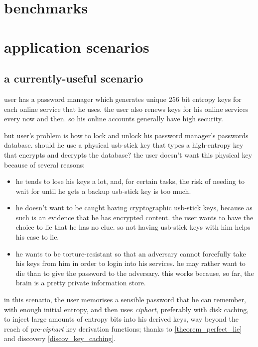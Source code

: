 \documentclass[twocolumn]{article}
\begin{document}
\section{benchmarks}

\section{application scenarios}
\subsection{a currently-useful scenario}
user has a password manager which generates unique $256$ bit entropy keys for
each online service that he uses.  the user also renews keys for his online
services every now and then.   so his online accounts generally have high
security.

but user's problem is how to lock and unlock his password manager's
passwords database.  should he use a physical usb-stick key that types a
high-entropy key that encrypts and decrypts the database?   the user
doesn't want this physical key because of several reasons:
\begin{itemize}
    \item he tends to lose his keys a lot, and, for certain tasks, the risk
    of needing to wait for until he gets a backup usb-stick key is too
    much.

    \item he doesn't want to be caught having cryptographic usb-stick keys,
    because as such is an evidence that he has encrypted content.  the user
    wants to have the choice to lie that he has no clue.  so not having
    usb-stick keys with him helps his case to lie.

    \item he wants to be torture-resistant so that an adversary cannot
    forcefully take his keys from him in order to login into his services.
    he may rather want to die than to give the password to the adversary.
    this works because, so far, the brain is a pretty private information
    store.
\end{itemize}

in this scenario, the user memorises a sensible password that he can
remember, with enough initial entropy, and then uses \emph{ciphart},
preferably with disk caching, to inject large amounts of entropy bits into
his derived keys, way beyond the reach of pre-\emph{ciphart} key derivation
functions; thanks to \cref{theorem_perfect_lie} and discovery
\ref{discov_key_caching}.
\end{document}
